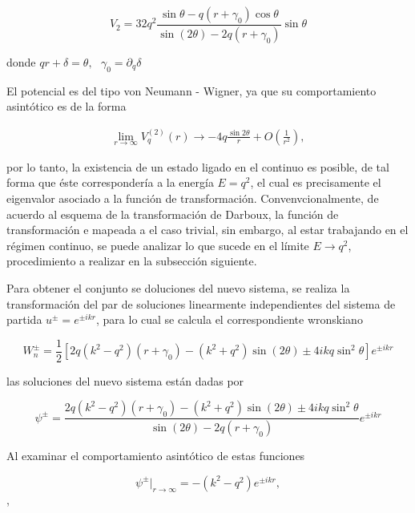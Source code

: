\begin{equation*}
V_2 = 32 q^2   \frac{\sin\theta-q(r+\gamma_0)\cos\theta}{\sin(2\theta)-2q(r+\gamma_0)}\sin\theta
\end{equation*}

donde $qr + \delta = \theta, \,\,\,\, \gamma_0 =\partial_q \delta$


El potencial es del tipo von Neumann - Wigner, ya que su comportamiento asintótico es de la forma

\begin{eqnarray*}
	\lim_{r\rightarrow\infty} V_q^{(2)}(r) \rightarrow -4q\frac{\sin{2\theta}}{r}+O\left(\frac{1}{r^2}\right),
\end{eqnarray*} 

por lo tanto, la existencia de un estado ligado en el continuo es posible, de tal forma que éste correspondería a la energía $E=q^2$, el cual es precisamente el eigenvalor asociado a la función de transformación. Convenvcionalmente, de acuerdo al esquema de la transformación de Darboux, la función de transformación e mapeada a el caso trivial, sin embargo, al estar trabajando en el régimen continuo, se puede analizar lo que sucede en el límite $E \to q^2$, procedimiento a realizar en la subsección siguiente.


Para obtener el conjunto se doluciones del nuevo sistema, se realiza la transformación del par de soluciones linearmente independientes del sistema de partida $u^{\pm} = e^{\pm ikr}$, para lo cual se calcula el correspondiente wronskiano

\begin{equation*}
W^{\pm}_n= \frac{1}{2}  [2 q (k^2 - q^2)(r + \gamma_0) - (k^2 + q^2)\sin(2 \theta) \pm 4 i kq \sin^2 \theta ] e^{\pm i k r}
\end{equation*}

las soluciones del nuevo sistema están dadas por

\begin{equation}
\psi^{\pm}= \frac{2 q (k^2 - q^2)(r + \gamma_0) - (k^2 + q^2)\sin(2 \theta) \pm 4 i kq \sin^2 \theta }{\sin(2 \theta)-2q(r + \gamma_0)}e^{\pm i k r} \label{PSIPM}
\end{equation}

Al examinar el comportamiento asintótico de estas funciones

\begin{equation}
\psi^{\pm}|_{r \to \infty} = -(k^2 - q^2) e^{\pm ikr},\label{CAP}
\end{equation},

